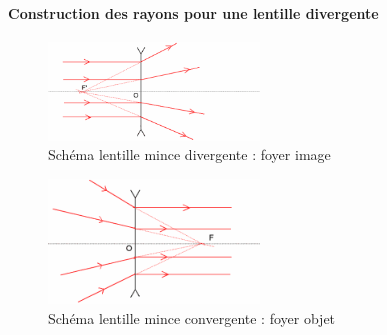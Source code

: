 \documentclass[a4paper,11pt]{article}
\begin{document}
\paragraph{Construction des rayons pour une lentille divergente}
\begin{figure}[h]
  \caption{Schéma lentille mince divergente : foyer image}
  \centering
  \includegraphics[width=0.5\textwidth]{lentillemincediv1}
\end{figure}
\begin{figure}[h]
  \caption{Schéma lentille mince convergente : foyer objet}
  \centering
  \includegraphics[width=0.5\textwidth]{lentillemincediv2}
\end{figure}
\end{document}
